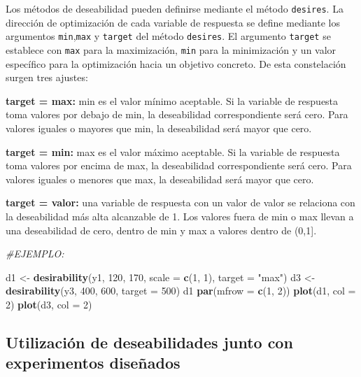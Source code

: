 \documentclass[
]{book}
\newenvironment{Shaded}{\begin{snugshade}}{\end{snugshade}}
\newcommand{\AttributeTok}[1]{\textcolor[rgb]{0.13,0.29,0.53}{#1}}
\newcommand{\CommentTok}[1]{\textcolor[rgb]{0.56,0.35,0.01}{\textit{#1}}}
\newcommand{\DecValTok}[1]{\textcolor[rgb]{0.00,0.00,0.81}{#1}}
\newcommand{\FunctionTok}[1]{\textcolor[rgb]{0.13,0.29,0.53}{\textbf{#1}}}
\newcommand{\NormalTok}[1]{#1}
\newcommand{\OtherTok}[1]{\textcolor[rgb]{0.56,0.35,0.01}{#1}}
\newcommand{\StringTok}[1]{\textcolor[rgb]{0.31,0.60,0.02}{#1}}
\begin{document}
Los métodos de deseabilidad pueden definirse mediante el método \texttt{desires}. La dirección de optimización de cada variable de respuesta se define mediante los argumentos \texttt{min},\texttt{max} y \texttt{target} del método \texttt{desires}. El argumento \texttt{target} se establece con \texttt{max} para la maximización, \texttt{min} para la minimización y un valor específico para la optimización hacia un objetivo concreto. De esta constelación surgen tres ajustes:

\textbf{target = max:} min es el valor mínimo aceptable. Si la variable de respuesta toma valores por debajo de min, la deseabilidad correspondiente será cero. Para valores iguales o mayores que min, la deseabilidad será mayor que cero.

\textbf{target = min:} max es el valor máximo aceptable. Si la variable de respuesta toma valores por encima de max, la deseabilidad correspondiente será cero. Para valores iguales o menores que max, la deseabilidad será mayor que cero.

\textbf{target = valor:} una variable de respuesta con un valor de valor se relaciona con la deseabilidad más alta alcanzable de 1. Los valores fuera de min o max llevan a una deseabilidad de cero, dentro de min y max a valores dentro de (0,1{]}.

\begin{Shaded}
\begin{Highlighting}[]
\CommentTok{\#EJEMPLO:}

\NormalTok{d1 }\OtherTok{\textless{}{-}} \FunctionTok{desirability}\NormalTok{(y1, }\DecValTok{120}\NormalTok{, }\DecValTok{170}\NormalTok{, }\AttributeTok{scale =} \FunctionTok{c}\NormalTok{(}\DecValTok{1}\NormalTok{, }\DecValTok{1}\NormalTok{), }\AttributeTok{target =} \StringTok{"max"}\NormalTok{)}
\NormalTok{d3 }\OtherTok{\textless{}{-}} \FunctionTok{desirability}\NormalTok{(y3, }\DecValTok{400}\NormalTok{, }\DecValTok{600}\NormalTok{, }\AttributeTok{target =} \DecValTok{500}\NormalTok{)}
\NormalTok{d1}
\FunctionTok{par}\NormalTok{(}\AttributeTok{mfrow =} \FunctionTok{c}\NormalTok{(}\DecValTok{1}\NormalTok{, }\DecValTok{2}\NormalTok{))}
\FunctionTok{plot}\NormalTok{(d1, }\AttributeTok{col =} \DecValTok{2}\NormalTok{)}
\FunctionTok{plot}\NormalTok{(d3, }\AttributeTok{col =} \DecValTok{2}\NormalTok{)}
\end{Highlighting}
\end{Shaded}

\hypertarget{utilizaciuxf3n-de-deseabilidades-junto-con-experimentos-diseuxf1ados}{%
\subsection{Utilización de deseabilidades junto con experimentos diseñados}\label{utilizaciuxf3n-de-deseabilidades-junto-con-experimentos-diseuxf1ados}}
\end{document}
